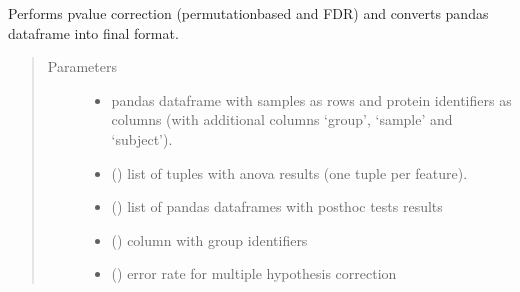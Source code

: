 \documentclass[letterpaper,10pt,english]{sphinxmanual}
\begin{document}
\begin{fulllineitems}
\label{\detokenize{_autosummary/analytics_core.analytics:analytics_core.analytics.analytics.format_anova_table}}
Performs p\sphinxhyphen{}value correction (permutation\sphinxhyphen{}based and FDR) and converts pandas dataframe into final format.
\begin{quote}\begin{description}
\item[{Parameters}] \leavevmode\begin{itemize}
\item {} 
 \textendash{} pandas dataframe with samples as rows and protein identifiers as columns (with additional columns ‘group’, ‘sample’ and ‘subject’).

\item {} 
 (\sphinxstyleliteralemphasis{\sphinxupquote{{[}}}\sphinxstyleliteralemphasis{\sphinxupquote{{]}}}) \textendash{} list of tuples with anova results (one tuple per feature).

\item {} 
 (\sphinxstyleliteralemphasis{\sphinxupquote{{[}}}\sphinxstyleliteralemphasis{\sphinxupquote{{]}}}) \textendash{} list of pandas dataframes with posthoc tests results

\item {} 
 () \textendash{} column with group identifiers

\item {} 
 () \textendash{} error rate for multiple hypothesis correction


\end{itemize}
\end{description}
\end{quote}
\end{fulllineitems}
\end{document}
